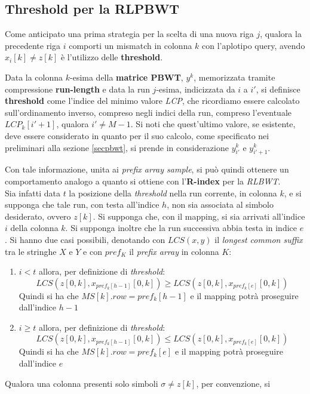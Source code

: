\subsection{Threshold per la RLPBWT}
Come anticipato una prima strategia per la scelta di una nuova riga $j$, qualora
la precedente riga $i$ comporti un mismatch in colonna $k$ con l'aplotipo query,
avendo $x_i[k]\neq z[k]$ è l'utilizzo delle \textbf{threshold}.
\begin{definizione}
  Data la colonna $k$-esima della \textbf{matrice PBWT}, $y^k$, memorizzata
  tramite compressione \textbf{run-length} e data la run $j$-esima, indicizzata
  da $i$ a $i'$, si definisce \textbf{threshold} come l'indice del minimo valore
  \textit{LCP}, che ricordiamo essere calcolato sull'ordinamento inverso,
  compreso negli indici della run, compreso l'eventuale 
  $LCP_k[i'+1]$, qualora $i'\neq M-1$. Si noti che quest'ultimo valore, se
  esistente, deve essere considerato in quanto per il suo calcolo, come
  specificato nei preliminari alla sezione \ref{secpbwt}, si prende in
  considerazione $y^k_{i'}$ e $y^k_{i'+1}$.
\end{definizione}
Con tale informazione, unita ai \textit{prefix array sample}, si può quindi
ottenere un comportamento analogo a quanto si ottiene con l'\textbf{R-index} per
la \textit{RLBWT}.\\
Sia infatti data $t$ la posizione della \textit{threshold} nella run corrente,
in colonna $k$, e
si supponga che tale run, con testa all'indice $h$, non sia associata al simbolo
desiderato, ovvero $z[k]$. Si supponga che, con il mapping, si sia arrivati
all'indice $i$ della colonna $k$. Si supponga inoltre che la run successiva
abbia testa in indice $e$. Si hanno due casi possibili, denotando con
$LCS(x,y)$ il \textit{longest common suffix} tra le stringhe $X$ e $Y$ e con
$pref_K$ il \textit{prefix array} in colonna $K$:
\begin{enumerate}
  \item $i<t$ allora, per definizione di \textit{threshold}:
  \[LCS(z[0,k], x_{pref_{k}[h-1]}[0,k])\geq LCS(z[0,k], x_{pref_{k}[e]}[0,k])\]
  Quindi si ha che $MS[k].row=pref_{k}[h-1]$ e il mapping potrà proseguire
  dall'indice $h-1$
  \item  $i\geq t$ allora, per definizione di \textit{threshold}:
  \[LCS(z[0,k], x_{pref_{k}[h-1]}[0,k])\leq LCS(z[0,k], x_{pref_{k}[e]}[0,k])\]
  Quindi si ha che $MS[k].row=pref_{k}[e]$ e il mapping potrà proseguire
  dall'indice $e$
\end{enumerate}
Qualora una colonna presenti solo simboli $\sigma\neq z[k]$, per convenzione, si

